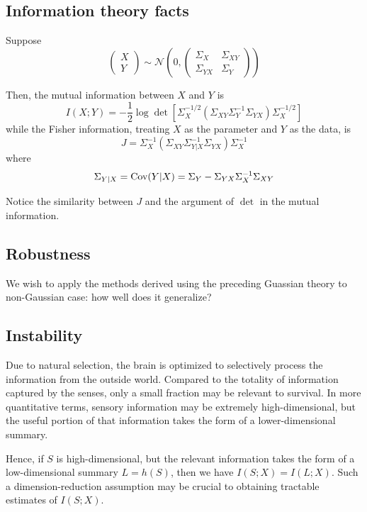\documentclass[12pt]{article}
\begin{document}
\subsection{Information theory facts}

Suppose
\[
\begin{pmatrix}
X \\ Y
\end{pmatrix}
\sim \mathcal{N}\left(
0, \begin{pmatrix}
\Sigma_X & \Sigma_{XY} \\
\Sigma_{YX} & \Sigma_Y
\end{pmatrix}
\right)
\]

Then, the mutual information between $X$ and $Y$ is
\[
I(X; Y) = -\frac{1}{2}\log \det[\Sigma_X^{-1/2}(\Sigma_{XY}\Sigma_Y^{-1}\Sigma_{YX})\Sigma_X^{-1/2}]
\]
while the Fisher information, treating $X$ as the parameter and $Y$ as the data, is
\[
J = \Sigma_X^{-1}(\Sigma_{XY}\Sigma_{Y|X}^{-1}\Sigma_{YX})\Sigma_X^{-1}
\]
where
\[
\Sigma_{Y|X} = \text{Cov}(Y|X) = \Sigma_Y - \Sigma_{YX}\Sigma_X^{-1}\Sigma_{XY}
\]

Notice the similarity between $J$ and the argument of $\det$ in the mutual information.

\subsection{Robustness}

We wish to apply the methods derived using the preceding Guassian
theory to non-Gaussian case: how well does it generalize?

\subsection{Instability}

Due to natural selection, the brain is optimized to selectively
process the information from the outside world.  Compared to the
totality of information captured by the senses, only a small fraction
may be relevant to survival.  In more quantitative terms, sensory
information may be extremely high-dimensional, but the useful portion
of that information takes the form of a lower-dimensional summary.

Hence, if $S$ is high-dimensional, but the relevant information takes
the form of a low-dimensional summary $L = h(S)$, then we have $I(S;
X) = I(L; X)$.  Such a dimension-reduction assumption may be crucial
to obtaining tractable estimates of $I(S; X)$.
\end{document}
